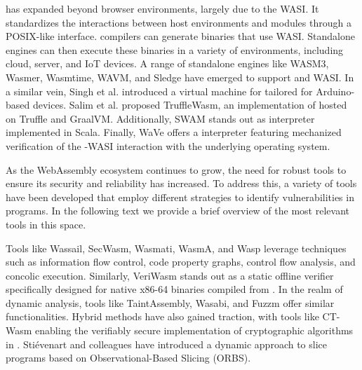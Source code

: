  \wasm has expanded beyond browser environments, largely due to the WASI\cite{WASI}. 
It standardizes the interactions between host environments and \Wasm modules through a POSIX-like interface.
\wasm compilers can generate binaries that use WASI.
Standalone engines can then execute these binaries in a variety of environments, including cloud, server, and IoT devices.
A range of standalone engines like WASM3, Wasmer, Wasmtime, WAVM, and Sledge\cite{Sledge} have emerged to support \Wasm and WASI. 
In a similar vein, Singh et al.\cite{WARDuino2019} introduced a virtual machine for \Wasm tailored for Arduino-based devices. 
Salim et al.\cite{trufflewasm} proposed TruffleWasm, an implementation of \Wasm hosted on Truffle and GraalVM. 
Additionally, SWAM stands out as \Wasm interpreter implemented in Scala. 
Finally, WaVe\cite{wave} offers a \Wasm interpreter featuring mechanized verification of the \Wasm-WASI interaction with the underlying operating system.


As the WebAssembly ecosystem continues to grow, the need for robust tools to ensure its security and reliability has increased. 
To address this, a variety of tools have been developed that employ different strategies to identify vulnerabilities in \Wasm programs. 
In the following text we provide a brief overview of the most relevant tools in this space.

\vspace{10mm}
Tools like Wassail\cite{wassail}, SecWasm\cite{secwasm}, Wasmati\cite{wasmati}, WasmA\cite{wasma}, and Wasp\cite{Wasp} leverage techniques such as information flow control, code property graphs, control flow analysis, and concolic execution. 
Similarly, VeriWasm\cite{veriwasm} stands out as a static offline verifier specifically designed for native x86-64 binaries compiled from \Wasm. 
In the realm of dynamic analysis, tools like TaintAssembly\cite{taintassembly}, Wasabi\cite{wasabi}, and Fuzzm\cite{fuzzm} offer similar functionalities. 
Hybrid methods have also gained traction, with tools like CT-Wasm\cite{ctwasm} enabling the verifiably secure implementation of cryptographic algorithms in \Wasm. 
Stiévenart and colleagues have introduced a dynamic approach to slice \Wasm programs based on Observational-Based Slicing (ORBS)\cite{slicing, slicing2}. 


